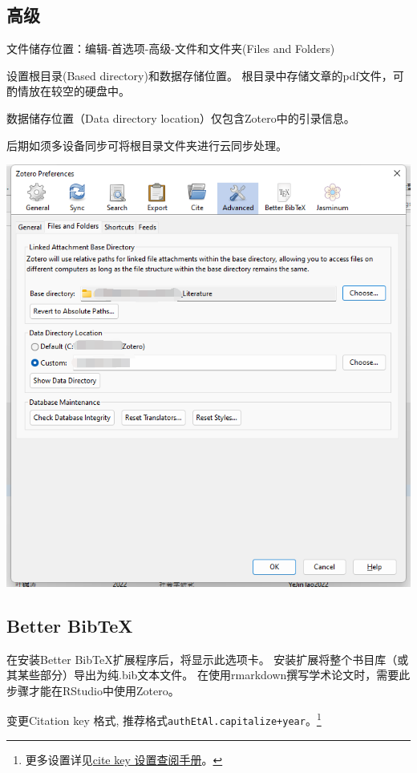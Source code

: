 \documentclass[
  letterpaper,
  DIV=11,
  numbers=noendperiod,
  oneside]{scrreprt}
\begin{document}
\hypertarget{sec-zotero-advanced}{%
\subsection{高级}\label{sec-zotero-advanced}}

文件储存位置：编辑-首选项-高级-文件和文件夹(Files and Folders)

设置根目录(Based directory)和数据存储位置。
根目录中存储文章的pdf文件，可酌情放在较空的硬盘中。

数据储存位置（Data directory location）仅包含Zotero中的引录信息。

后期如须多设备同步可将根目录文件夹进行云同步处理。

\includegraphics{./images/zotero_advanced.png}

\hypertarget{better-bibtex}{%
\subsection{Better BibTeX}\label{better-bibtex}}

在安装Better BibTeX扩展程序后，将显示此选项卡。
安装扩展将整个书目库（或其某些部分）导出为纯.bib文本文件。
在使用rmarkdown撰写学术论文时，需要此步骤才能在RStudio中使用Zotero。

变更Citation key 格式,
推荐格式\texttt{authEtAl.capitalize+year}。\footnote{更多设置详见\href{https://retorque.re/zotero-better-bibtex/citation-keys/}{cite
  key 设置查阅手册}。}
\end{document}
